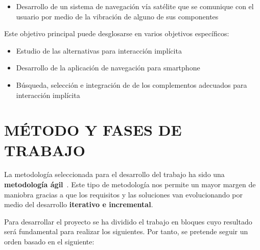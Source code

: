 \documentclass{pre-tfg}
\begin{document}
\begin{itemize}
\item Desarrollo de un sistema de navegación vía satélite que se
  comunique con el usuario por medio de la vibración de alguno de sus componentes
\end{itemize}

Este objetivo principal puede desglosarse en varios objetivos específicos:

\begin{itemize}
\item Estudio de las alternativas para interacción implícita
\item Desarrollo de la aplicación de navegación para smartphone
\item Búsqueda, selección e integración de de los complementos adecuados para
  interacción implícita
\end{itemize}

\section{MÉTODO Y FASES DE TRABAJO}

La metodología seleccionada para el desarrollo del trabajo ha sido una \textbf{metodología
  ágil}~\cite{Poole09}. Este tipo de metodología nos permite un mayor margen de maniobra
gracias a que los requisitos y las soluciones van evolucionando por medio del desarrollo
\textbf{iterativo e incremental}.

Para desarrollar el proyecto se ha dividido el trabajo en bloques cuyo resultado será
fundamental para realizar los siguientes. Por tanto, se pretende seguir un orden basado en
el siguiente:
\end{document}
